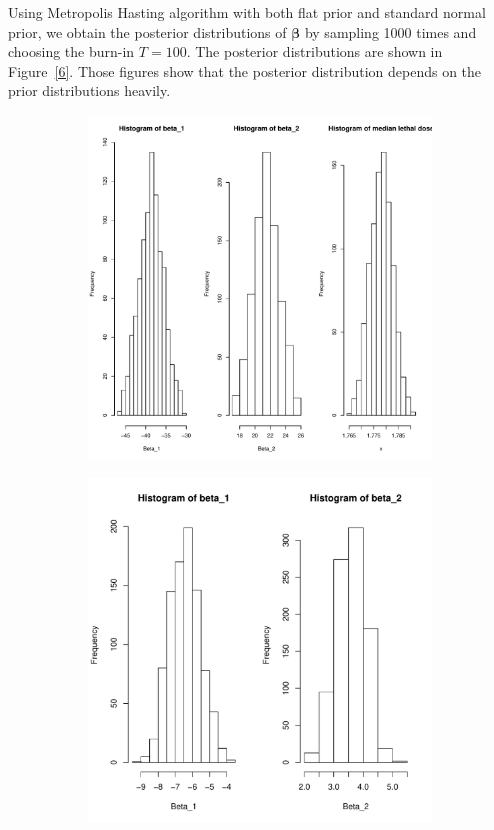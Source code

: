 \documentclass[]{article}
\begin{document}
\begin{enumerate}
{\begin{itemize}
        	Using Metropolis Hasting algorithm with both flat prior and standard normal prior, we obtain the posterior distributions of $\bm \beta$ by sampling 1000 times and choosing the burn-in $T = 100$. The posterior distributions are shown in Figure~\ref{6}. Those figures show that the posterior distribution depends on the prior distributions heavily.\par
        	\begin{figure}[ht!]
        		\centering
        		\begin{subfigure}{0.45\textwidth}
        			\includegraphics[width = \textwidth]{pic/HW3_2/a1.pdf}
        		\end{subfigure}
        		\begin{subfigure}{0.45\textwidth}
        			\includegraphics[width = \textwidth]{pic/HW3_2/a2.pdf}

\end{subfigure}
\end{figure}
\end{itemize}}
\end{enumerate}
\end{document}
